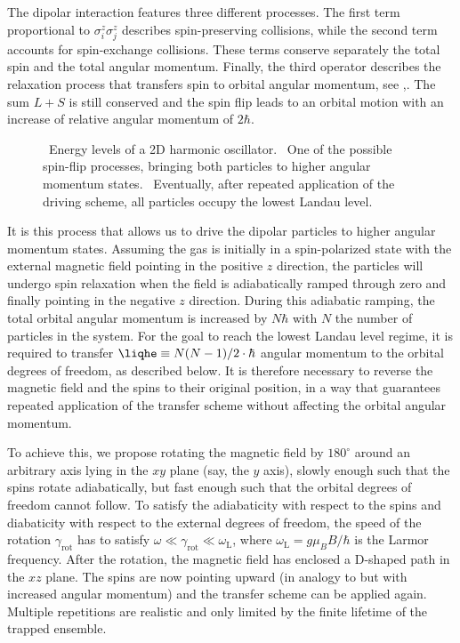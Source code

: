 The dipolar interaction features three different processes. The first term proportional to $\sigma^z_i\sigma^z_j$ describes spin-preserving collisions, while the second term  accounts for spin-exchange collisions. These terms conserve separately the total spin and the total angular momentum.  Finally, the third operator  describes the relaxation process that transfers spin to orbital angular momentum, see ,. The sum $L+S$ is still conserved and the spin flip leads to an orbital motion with an increase of relative angular momentum of $2\hbar$.

\begin{figure}[t]
    \centering
    \caption{\sfA~Energy levels of a 2D harmonic oscillator. \sfB~One of the possible spin-flip processes, bringing both particles to higher angular momentum states. \sfC~Eventually, after repeated application of the driving scheme, all particles occupy the lowest Landau level.}
\end{figure}

It is this process that allows us to drive the dipolar particles to higher angular momentum states. Assuming the gas is initially in a spin-polarized state with the external magnetic field pointing in the positive $z$ direction, the particles will undergo spin relaxation when the field is adiabatically ramped through zero and finally pointing in the negative $z$ direction. During this adiabatic ramping,
the total orbital angular momentum is increased by $N\hbar$ with $N$ the number of particles in the system.  For the goal to reach the lowest Landau level regime, it is required to transfer  $\liqhe\equiv N(N-1)/2 \cdot \hbar$ angular momentum to the orbital degrees of freedom, as described below. It is therefore necessary to reverse the magnetic field and the spins to their original position, in a way that guarantees repeated application of the transfer scheme without affecting the orbital angular momentum.

To achieve this, we propose rotating the magnetic field by $180^\circ$ around an arbitrary axis lying in the $xy$ plane (say, the $y$ axis), slowly enough such that the spins rotate adiabatically, but fast enough such that the orbital degrees of freedom cannot follow. To satisfy the adiabaticity with respect to the spins and diabaticity with respect to the external degrees of freedom, the speed of the rotation $\gamma_\text{rot}$ has to satisfy
$\omega \ll \gamma_\text{rot} \ll \omega_\text{L}$, where $\omega_\text{L}=g\mu_B B/\hbar$ is the Larmor frequency. After the rotation, the magnetic field has enclosed a \textsf{D}-shaped path in the $xz$ plane. The spins are now pointing upward (in analogy to  but with
increased angular momentum) and the transfer scheme can be applied again. Multiple repetitions are realistic and only limited by the finite lifetime of the trapped ensemble.

